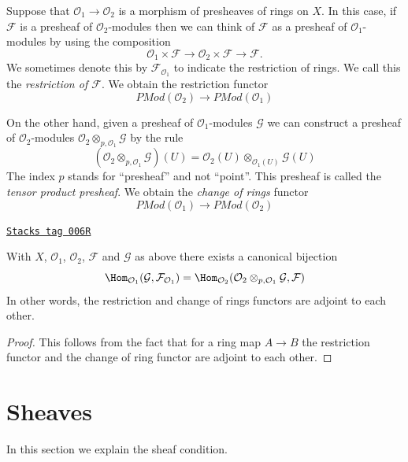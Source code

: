 Suppose that $\mathcal{O}_1 \to \mathcal{O}_2$ is a
morphism of presheaves of rings on $X$. In this case,
if $\mathcal{F}$ is a presheaf of $\mathcal{O}_2$-modules
then we can think of $\mathcal{F}$ as a presheaf of
$\mathcal{O}_1$-modules by using the composition
$$
\mathcal{O}_1 \times \mathcal{F}
\to
\mathcal{O}_2 \times \mathcal{F}
\to
\mathcal{F}.
$$
We sometimes denote this by $\mathcal{F}_{\mathcal{O}_1}$
to indicate the restriction of rings. We call this
the {\it restriction of $\mathcal{F}$}. We obtain the
restriction functor
$$
\textit{PMod}(\mathcal{O}_2)
\longrightarrow
\textit{PMod}(\mathcal{O}_1)
$$

\medskip\noindent
On the other hand, given a presheaf of $\mathcal{O}_1$-modules
$\mathcal{G}$
we can construct a presheaf of $\mathcal{O}_2$-modules
$\mathcal{O}_2 \otimes_{p, \mathcal{O}_1} \mathcal{G}$
by the rule
$$
\left(\mathcal{O}_2 \otimes_{p, \mathcal{O}_1} \mathcal{G}\right)(U)
=
\mathcal{O}_2(U) \otimes_{\mathcal{O}_1(U)} \mathcal{G}(U)
$$
The index $p$ stands for ``presheaf'' and not ``point''.
This presheaf is called the {\it tensor product presheaf}. We obtain
the {\it change of rings} functor
$$
\textit{PMod}(\mathcal{O}_1)
\longrightarrow
\textit{PMod}(\mathcal{O}_2)
$$

\begin{lemma}
\label{sheaves-lemma-adjointness-tensor-restrict-presheaves}
\href{https://stacks.math.columbia.edu/tag/006R}{\texttt{Stacks tag 006R}}

With $X$, $\mathcal{O}_1$, $\mathcal{O}_2$, $\mathcal{F}$ and
$\mathcal{G}$ as above there exists a canonical bijection
$$
\Hom_{\mathcal{O}_1}(\mathcal{G}, \mathcal{F}_{\mathcal{O}_1})
=
\Hom_{\mathcal{O}_2}(
\mathcal{O}_2 \otimes_{p, \mathcal{O}_1} \mathcal{G},
\mathcal{F}
)
$$
In other words, the restriction and change of rings functors
are adjoint to each other.
\end{lemma}

\begin{proof}
This follows from the fact that for a ring map
$A \to B$ the restriction functor and the change
of ring functor are adjoint to each other.
\end{proof}

\section{Sheaves}
\label{sheaves-section-sheaves}
In this section we explain the sheaf condition.

